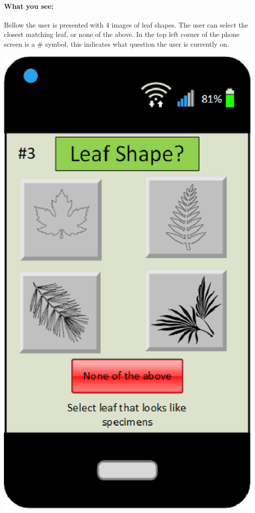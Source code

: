 \documentclass[a4paper]{article}
\begin{document}
\paragraph{What you see:}
Bellow the user is presented with 4 images of leaf shapes. The user can select the closest matching leaf, or none of the above. In the top left corner of the phone screen is a \# symbol, this indicates what question the user is currently on.
\begin{center}\includegraphics[scale=.8]{20Questions.eps}\end{center}
\pagebreak
\end{document}
